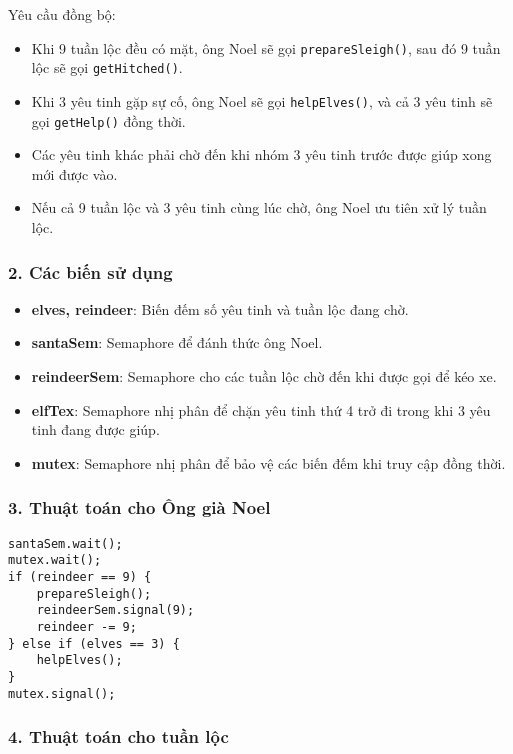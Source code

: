 Yêu cầu đồng bộ:

\begin{itemize}
  \item Khi 9 tuần lộc đều có mặt, ông Noel sẽ gọi \texttt{prepareSleigh()}, sau đó 9 tuần lộc sẽ gọi \texttt{getHitched()}.
  \item Khi 3 yêu tinh gặp sự cố, ông Noel sẽ gọi \texttt{helpElves()}, và cả 3 yêu tinh sẽ gọi \texttt{getHelp()} đồng thời.
  \item Các yêu tinh khác phải chờ đến khi nhóm 3 yêu tinh trước được giúp xong mới được vào.
  \item Nếu cả 9 tuần lộc và 3 yêu tinh cùng lúc chờ, ông Noel ưu tiên xử lý tuần lộc.
\end{itemize}

\subsubsection*{2. Các biến sử dụng}

\begin{itemize}
  \item \textbf{elves, reindeer}: Biến đếm số yêu tinh và tuần lộc đang chờ.
  \item \textbf{santaSem}: Semaphore để đánh thức ông Noel.
  \item \textbf{reindeerSem}: Semaphore cho các tuần lộc chờ đến khi được gọi để kéo xe.
  \item \textbf{elfTex}: Semaphore nhị phân để chặn yêu tinh thứ 4 trở đi trong khi 3 yêu tinh đang được giúp.
  \item \textbf{mutex}: Semaphore nhị phân để bảo vệ các biến đếm khi truy cập đồng thời.
\end{itemize}

\subsubsection*{3. Thuật toán cho Ông già Noel}

\begin{lstlisting}
santaSem.wait();
mutex.wait();
if (reindeer == 9) {
    prepareSleigh();
    reindeerSem.signal(9);
    reindeer -= 9;
} else if (elves == 3) {
    helpElves();
}
mutex.signal();
\end{lstlisting}




\subsubsection*{4. Thuật toán cho tuần lộc}

